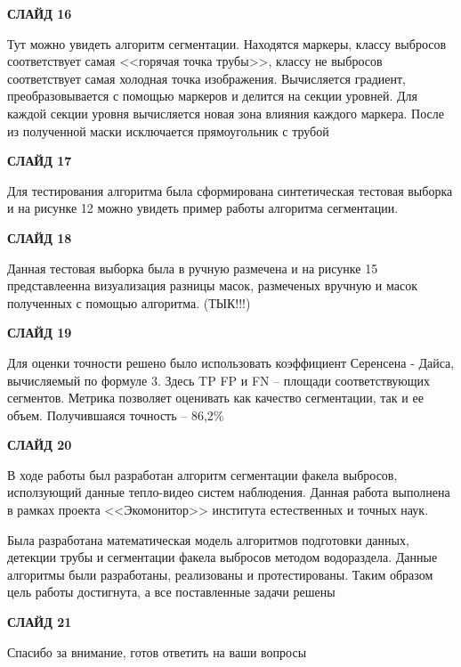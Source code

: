\documentclass[14pt, a4paper]{extreport}
\begin{document}
	\textbf{СЛАЙД 16}
	 
	Тут можно увидеть алгоритм сегментации. Находятся маркеры, классу выбросов соответствует самая <<горячая точка трубы>>, классу не выбросов соответствует самая холодная точка изображения. Вычисляется градиент, преобразовывается с помощью маркеров и делится на секции уровней. Для каждой секции уровня вычисляется новая зона влияния каждого маркера. После из полученной маски исключается прямоугольник с трубой
	 
	 \textbf{СЛАЙД 17}
	 
	 Для тестирования алгоритма была сформирована синтетическая тестовая выборка и на рисунке 12 можно увидеть пример работы алгоритма сегментации.
	 
	 \textbf{СЛАЙД 18}
	 
	 Данная тестовая выборка была в ручную размечена и на рисунке 15 представлеенна визуализация разницы масок, размеченых вручную и масок полученных с помощью алгоритма. (ТЫК!!!)
	 
	 \textbf{СЛАЙД 19}
	 
	 Для оценки точности решено было использовать коэффициент Серенсена - Дайса, вычисляемый по формуле 3. Здесь TP FP и FN -- площади соответствующих сегментов. Метрика позволяет оценивать как качество сегментации, так и ее объем. Получившаяся точность -- 86,2\%
	 
	 \textbf{СЛАЙД 20}
	 
	 В ходе работы был разработан алгоритм сегментации факела выбросов, исползующий данные тепло-видео систем наблюдения. Данная работа выполнена в рамках проекта <<Экомонитор>> института естественных и точных наук.
	 
	 Была разработана математическая модель алгоритмов подготовки данных, детекции трубы и сегментации факела выбросов методом водораздела. Данные алгоритмы были разработаны, реализованы и протестированы. Таким образом цель работы достигнута, а все поставленные задачи решены
	 
	 \textbf{СЛАЙД 21}
	 
	 Спасибо за внимание, готов ответить на ваши вопросы
\end{document}
